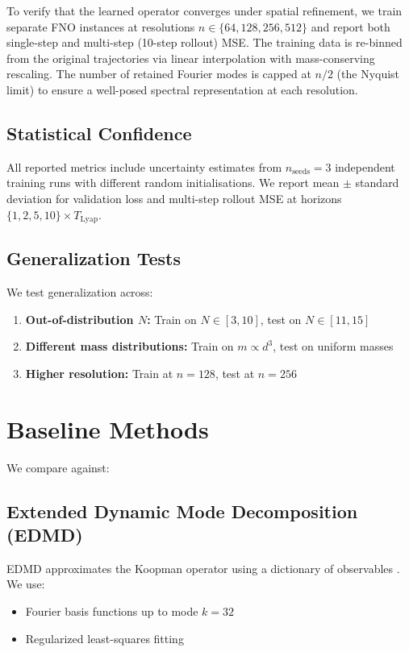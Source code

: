 \documentclass[11pt]{article}
\begin{document}
To verify that the learned operator converges under spatial refinement, we train separate FNO instances at resolutions $n \in \{64, 128, 256, 512\}$ and report both single-step and multi-step (10-step rollout) MSE. The training data is re-binned from the original trajectories via linear interpolation with mass-conserving rescaling. The number of retained Fourier modes is capped at $n/2$ (the Nyquist limit) to ensure a well-posed spectral representation at each resolution.

\subsection{Statistical Confidence}

All reported metrics include uncertainty estimates from $n_{\text{seeds}} = 3$ independent training runs with different random initialisations. We report mean $\pm$ standard deviation for validation loss and multi-step rollout MSE at horizons $\{1, 2, 5, 10\} \times T_{\text{Lyap}}$.

\subsection{Generalization Tests}

We test generalization across:
\begin{enumerate}
    \item \textbf{Out-of-distribution $N$:} Train on $N \in [3, 10]$, test on $N \in [11, 15]$
    \item \textbf{Different mass distributions:} Train on $m \propto d^3$, test on uniform masses
    \item \textbf{Higher resolution:} Train at $n = 128$, test at $n = 256$
\end{enumerate}

\section{Baseline Methods}

We compare against:

\subsection{Extended Dynamic Mode Decomposition (EDMD)}

EDMD approximates the Koopman operator using a dictionary of observables \cite{williams2015data}. We use:
\begin{itemize}
    \item Fourier basis functions up to mode $k = 32$
    \item Regularized least-squares fitting
\end{itemize}
\end{document}
